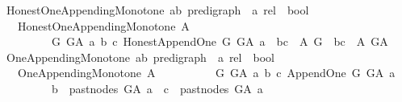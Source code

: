 \begin{isabellebody}
\ Honest{\isacharunderscore}{\kern0pt}One{\isacharunderscore}{\kern0pt}Appending{\isacharunderscore}{\kern0pt}Monotone{\isacharcolon}{\kern0pt}{\isacharcolon}{\kern0pt}\ {\isachardoublequoteopen}{\isacharparenleft}{\kern0pt}{\isacharparenleft}{\kern0pt}{\isacharprime}{\kern0pt}a{\isacharcomma}{\kern0pt}{\isacharprime}{\kern0pt}b{\isacharparenright}{\kern0pt}\ pre{\isacharunderscore}{\kern0pt}digraph\ {\isasymRightarrow}\ {\isacharprime}{\kern0pt}a\ rel{\isacharparenright}{\kern0pt}\ {\isasymRightarrow}\ bool\ {\isachardoublequoteclose}\isanewline
\ \ \ {\isachardoublequoteopen}Honest{\isacharunderscore}{\kern0pt}One{\isacharunderscore}{\kern0pt}Appending{\isacharunderscore}{\kern0pt}Monotone\ A\ {\isasymequiv}\isanewline
\ \ \ \ \ \ \ \ \ {\isacharparenleft}{\kern0pt}{\isasymforall}G\ G{\isacharunderscore}{\kern0pt}A\ a\ b\ c{\isachardot}{\kern0pt}\ Honest{\isacharunderscore}{\kern0pt}Append{\isacharunderscore}{\kern0pt}One\ G\ G{\isacharunderscore}{\kern0pt}A\ a\ {\isasymlongrightarrow}\ {\isacharparenleft}{\kern0pt}{\isacharparenleft}{\kern0pt}b{\isacharcomma}{\kern0pt}c{\isacharparenright}{\kern0pt}\ {\isasymin}\ {\isacharparenleft}{\kern0pt}A\ G{\isacharparenright}{\kern0pt}\ {\isasymlongrightarrow}\ {\isacharparenleft}{\kern0pt}b{\isacharcomma}{\kern0pt}c{\isacharparenright}{\kern0pt}\ {\isasymin}\ {\isacharparenleft}{\kern0pt}A\ G{\isacharunderscore}{\kern0pt}A{\isacharparenright}{\kern0pt}{\isacharparenright}{\kern0pt}{\isacharparenright}{\kern0pt}{\isachardoublequoteclose}\isanewline
\isanewline
\isanewline
{}\isamarkupfalse%
\ One{\isacharunderscore}{\kern0pt}Appending{\isacharunderscore}{\kern0pt}Monotone{\isacharcolon}{\kern0pt}{\isacharcolon}{\kern0pt}\ {\isachardoublequoteopen}{\isacharparenleft}{\kern0pt}{\isacharparenleft}{\kern0pt}{\isacharprime}{\kern0pt}a{\isacharcomma}{\kern0pt}{\isacharprime}{\kern0pt}b{\isacharparenright}{\kern0pt}\ pre{\isacharunderscore}{\kern0pt}digraph\ {\isasymRightarrow}\ {\isacharprime}{\kern0pt}a\ rel{\isacharparenright}{\kern0pt}\ {\isasymRightarrow}\ bool\ {\isachardoublequoteclose}\isanewline
\ \ \ {\isachardoublequoteopen}One{\isacharunderscore}{\kern0pt}Appending{\isacharunderscore}{\kern0pt}Monotone\ A\ {\isasymequiv}\isanewline
\ \ \ \ \ \ \ \ \ {\isacharparenleft}{\kern0pt}{\isasymforall}G\ G{\isacharunderscore}{\kern0pt}A\ a\ b\ c{\isachardot}{\kern0pt}\ {\isacharparenleft}{\kern0pt}Append{\isacharunderscore}{\kern0pt}One\ G\ G{\isacharunderscore}{\kern0pt}A\ a\ \isanewline
\ \ \ \ \ \ \ \ {\isasymand}\ {\isacharparenleft}{\kern0pt}{\isacharparenleft}{\kern0pt}b\ {\isasymin}\ past{\isacharunderscore}{\kern0pt}nodes\ G{\isacharunderscore}{\kern0pt}A\ a\ {\isasymand}\ c\ {\isasymin}\ past{\isacharunderscore}{\kern0pt}nodes\ G{\isacharunderscore}{\kern0pt}A\ a{\isacharparenright}{\kern0pt}\isanewline

\end{isabellebody}
